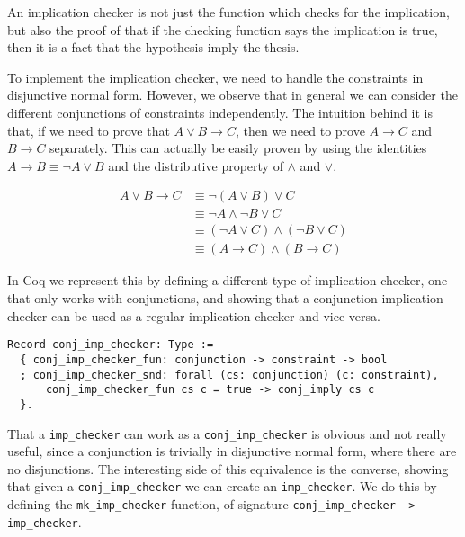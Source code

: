 An implication checker is not just the function which checks for the implication, but also the proof of
that if the checking function says the implication is true, then it is a fact that the hypothesis 
imply the thesis.

To implement the implication checker, we need to handle the constraints in disjunctive normal form. 
However, we observe that in general we can consider the different conjunctions of constraints 
independently. The intuition behind it is that, if we need to prove that $A \vee B \rightarrow C$, 
then we need to prove $A \rightarrow C$ and $B \rightarrow C$ separately. This can actually be easily 
proven by using the identities $A \rightarrow B \equiv \neg A \vee B$ and the distributive property of 
$\wedge$ and $\vee$.

\begin{align*}
A \vee B \rightarrow C &\equiv \neg (A \vee B) \vee C \\
                       &\equiv \neg A \wedge \neg B \vee C \\
                       &\equiv (\neg A \vee C)\wedge (\neg B \vee C) \\
                       &\equiv (A \rightarrow C)\wedge (B \rightarrow C)
\end{align*}


In Coq we represent this by defining a different type of implication checker, one that only works with 
conjunctions, and showing that a conjunction implication checker can be used as a regular implication
checker and vice versa.

\begin{verbatim}
Record conj_imp_checker: Type := 
  { conj_imp_checker_fun: conjunction -> constraint -> bool
  ; conj_imp_checker_snd: forall (cs: conjunction) (c: constraint),
      conj_imp_checker_fun cs c = true -> conj_imply cs c
  }.
\end{verbatim}

That a \texttt{imp_checker} can work as a \texttt{conj_imp_checker} is obvious and 
not really useful, since a conjunction is trivially in disjunctive normal form, where there are no 
disjunctions. The interesting side of this equivalence is the converse, showing that given a 
\texttt{conj_imp_checker} we can create an \texttt{imp_checker}. We do this by 
defining the \texttt{mk_imp_checker} function, of signature 
\texttt{conj_imp_checker -> imp_checker}.

